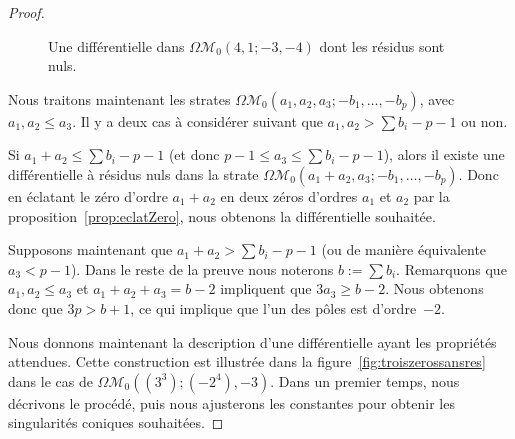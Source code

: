 \documentclass[JEP,XML,SOM,Unicode,francais,NoFloatCountersInSection,published]{cedram}
\let\mathcal\mathscr
\newcommand{\omoduli}[1][g]{{\Omega\mathcal M}_{\!#1}}
\theoremstyle{definition}
\begin{document}
\begin{proof}
\begin{figure}[htb]
\caption{Une différentielle dans $\omoduli[0](4,1;-3,-4)$ dont les résidus sont nuls.} \label{fig:ordremax}
\end{figure}
Nous traitons maintenant les strates $\omoduli[0](a_{1},a_{2},a_{3};-b_{1},\dots,-b_{p})$, avec \hbox{$a_{1}, a_{2}\!\leq\!a_{3}$}. Il y a deux cas à considérer suivant que $a_{1},a_{2}>\sum b_{i}-p-1$ ou non.
\par
Si $a_{1}+a_{2}\leq \sum b_{i}-p-1$ (et donc $p-1\leq a_{3} \leq \sum b_{i}-p-1$), alors il existe une différentielle à résidus nuls dans la strate $\omoduli[0](a_{1}+a_{2},a_{3};-b_{1},\dots,-b_{p})$. Donc en éclatant le zéro d'ordre $a_{1}+a_{2}$ en deux zéros d'ordres $a_{1}$ et $a_{2}$ par la proposition~\ref{prop:eclatZero}, nous obtenons la différentielle souhaitée.
\par
Supposons maintenant que $a_{1}+a_{2} > \sum b_{i}-p-1$ (ou de manière équivalente $a_{3}<p-1$). Dans le reste de la preuve nous noterons $b:=\sum b_{i}$. Remarquons que $a_{1},a_{2}\leq a_{3}$ et $a_{1}+a_{2}+a_{3}=b-2$ impliquent que $ 3a_{3} \geq b-2$. Nous obtenons donc que $3p>b+1$, ce qui implique que l'un des pôles est d'ordre~$-2$.
\par
Nous donnons maintenant la description d'une différentielle ayant les propriétés attendues. Cette construction est illustrée dans la figure~\ref{fig:troiszerossansres} dans le cas de $\omoduli[0]((3^3);(-2^4),-3)$. Dans un premier temps, nous décrivons le procédé, puis nous ajusterons les constantes pour obtenir les singularités coniques souhaitées.


\end{proof}
\end{document}
